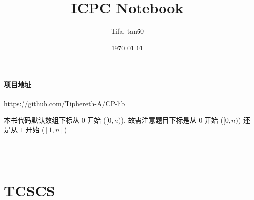 \documentclass[10pt]{ICPCnotebook}
\title{\vspace{-4ex}\Large{ICPC Notebook}}
\author{Tifa, tan60}
\date{\today}
\begin{document}
    \maketitle

    \pagestyle{plain}


    \paragraph{项目地址} \url{https://github.com/Tiphereth-A/CP-lib}

    本书代码默认数组下标从 \(0\) 开始 (\([0, n)\)), 故需注意题目下标是从 \(0\) 开始 (\([0, n)\)) 还是从 \(1\) 开始 (\([1, n]\))

    \inputminted{cpp}{src/src/main.cpp}

    \inputminted{cpp}{src/src/test.cpp}
    
    \inputminted{yaml}{src/src/.clang-format}

    \inputminted{bash}{src/src/run.sh}

    \newpage
    \begin{multicols}{2}
        \tableofcontents
    \end{multicols}

    \newpage
	\pagestyle{fancy}
	\setcounter{page}{1}

    
    

    \section{TCSCS}
    \label{sec:theoretical-computer-science-cheat-sheet}

    
    
    
    
\end{document}
